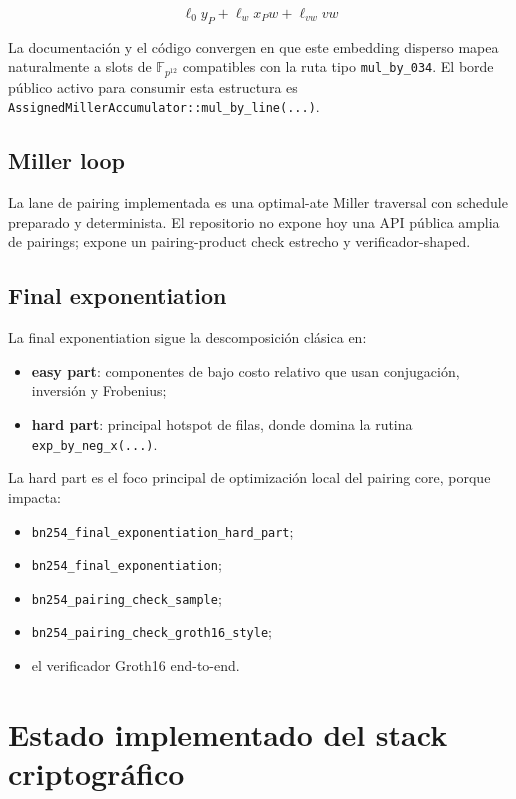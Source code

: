 \documentclass[11pt,a4paper]{article}
\begin{document}
\[
\ell_0 y_P + \ell_w x_P w + \ell_{vw} v w
\]

La documentaci\'on y el c\'odigo convergen en que este embedding disperso mapea naturalmente a
slots de \(\mathbb{F}_{p^{12}}\) compatibles con la ruta tipo \texttt{mul\_by\_034}.
El borde p\'ublico activo para consumir esta estructura es
\texttt{AssignedMillerAccumulator::mul\_by\_line(...)}.

\subsection{Miller loop}

La lane de pairing implementada es una optimal-ate Miller traversal con schedule preparado y
determinista. El repositorio no expone hoy una API p\'ublica amplia de pairings; expone un
pairing-product check estrecho y verificador-shaped.

\subsection{Final exponentiation}

La final exponentiation sigue la descomposici\'on cl\'asica en:

\begin{itemize}
  \item \textbf{easy part}: componentes de bajo costo relativo que usan conjugaci\'on, inversi\'on y Frobenius;
  \item \textbf{hard part}: principal hotspot de filas, donde domina la rutina \texttt{exp\_by\_neg\_x(...)}.
\end{itemize}

La hard part es el foco principal de optimizaci\'on local del pairing core, porque impacta:

\begin{itemize}
  \item \texttt{bn254\_final\_exponentiation\_hard\_part};
  \item \texttt{bn254\_final\_exponentiation};
  \item \texttt{bn254\_pairing\_check\_sample};
  \item \texttt{bn254\_pairing\_check\_groth16\_style};
  \item el verificador Groth16 end-to-end.
\end{itemize}

\section{Estado implementado del stack criptogr\'afico}
\end{document}
